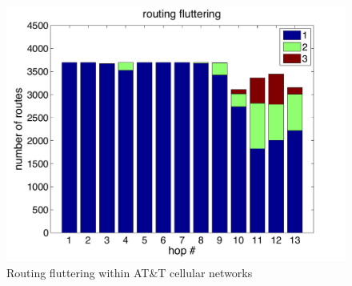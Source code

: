 \begin{figure}[!tbh]
  \centering
  \includegraphics[width=\linewidth]{../figs/mobile_fluttering.pdf}
  \vspace{-1em}
  \caption{Routing fluttering within AT\&T cellular networks}
  \label{fig:mobile_fluttering}
\end{figure}

